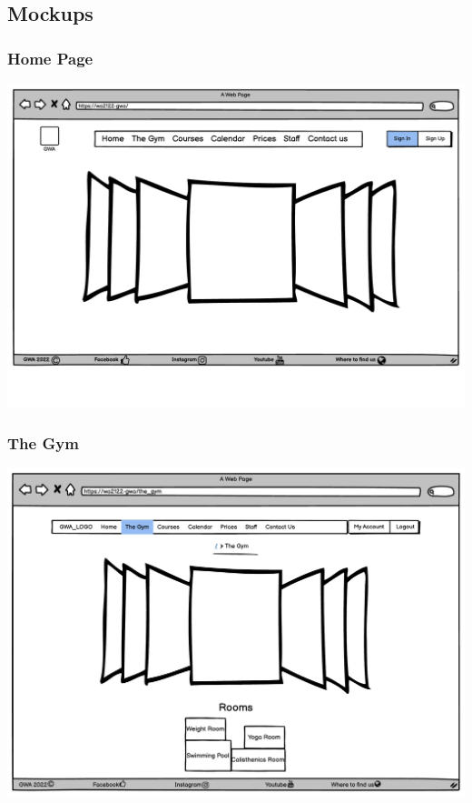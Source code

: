 \newpage
\subsection{Mockups}

\subsubsection{Home Page}
\includegraphics[width=\columnwidth]{InterfaceMockup/Index.pdf}

\subsubsection{The Gym}
\includegraphics[width=\columnwidth]{InterfaceMockup/TheGym/TheGym_desktopVersion.pdf}

